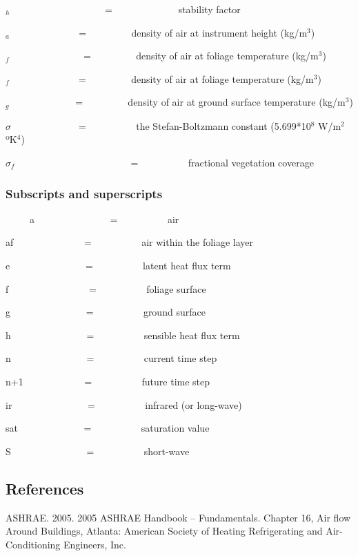 \Gamma\(_{h}\)~~~~~~~~~~~~~~~~~~~ = ~~~~~~~~~~~~~stability factor

\rho\(_{a}\)~ ~~~~~~~~~~~~ = ~~~~~~~~ density of air at instrument height (kg/m\(^{3}\))

\rho\(_{f}\)~ ~~~~~~~~~~~~~ = ~~~~~~~~ density of air at foliage temperature (kg/m\(^{3}\))

\rho\(_{f}\)~ ~~~~~~~~~~~~ = ~~~~~~~~ density of air at foliage temperature (kg/m\(^{3}\))

\rho\(_{g}\)~~~~~~~~~~~~~ = ~~~~~~~~ density of air at ground surface temperature (kg/m\(^{3}\))

\(\sigma\) ~ ~~~~~~~~~~~ = ~~~~~~~~~ the Stefan-Boltzmann constant (5.699*10\(^{8}\) W/m\(^{2}\) ºK\(^{4}\))

\({\sigma_f}\) ~~~~~~~~~~~ ~~~~~~~~~~~ = ~~~~~~~~~ fractional vegetation coverage

\subsubsection{Subscripts and superscripts}\label{subscripts-and-superscripts-000}

~~~~~a~~~~~~~~~~~~~~~ = ~~~~~~~~~ air

af~~~~~~~~~~~~~~ = ~~~~~~~~~ air within the foliage layer

e~~~~~~~~~~~~~~~ = ~~~~~~~~~ latent heat flux term

f~~~~~~~~~~~~~~~~ = ~~~~~~~~~ foliage surface

g~~~~~~~~~~~~~~~ = ~~~~~~~~~ ground surface

h~~~~~~~~~~~~~~~ = ~~~~~~~~~ sensible heat flux term

n~~~~~~~~~~~~~~~ = ~~~~~~~~~ current time step

n+1~~~~~~~~~~~~ = ~~~~~~~~~ future time step

ir~~~~~~~~~~~~~~~ = ~~~~~~~~~ infrared (or long-wave)

sat~~~~~~~~~~~~~ = ~~~~~~~~~ saturation value

S~~~~~~~~~~~~~~~ = ~~~~~~~~~ short-wave

\subsection{References}\label{references-025}

ASHRAE. 2005. 2005 ASHRAE Handbook -- Fundamentals. Chapter 16, Air flow Around Buildings, Atlanta: American Society of Heating Refrigerating and Air-Conditioning Engineers, Inc.

